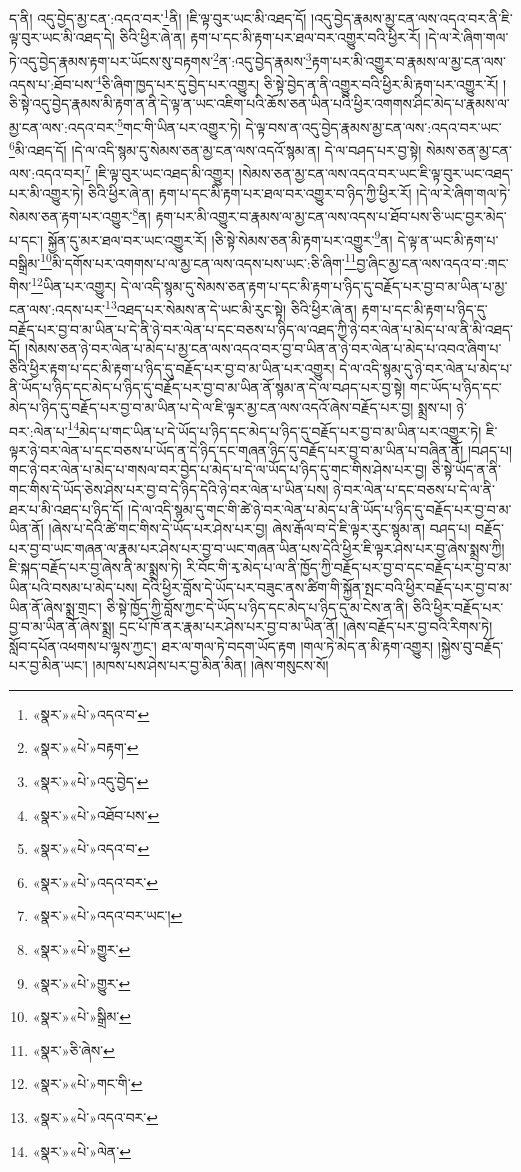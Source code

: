 ད་ནི། འདུ་བྱེད་མྱ་ངན་:འདའ་བར་\footnote{«སྣར་»«པེ་»འདའ་བ་}ནི། །ཇི་ལྟ་བུར་ཡང་མི་འཐད་དོ། །འདུ་བྱེད་རྣམས་མྱ་ངན་ལས་འདའ་བར་ནི་ཇི་ལྟ་བུར་ཡང་མི་འཐད་དེ། ཅིའི་ཕྱིར་ཞེ་ན། རྟག་པ་དང་མི་རྟག་པར་ཐལ་བར་འགྱུར་བའི་ཕྱིར་རོ། །དེ་ལ་རེ་ཞིག་གལ་ཏེ་འདུ་བྱེད་རྣམས་རྟག་པར་ཡོངས་སུ་བརྟགས་\footnote{«སྣར་»«པེ་»བརྟག་}ན་:འདུ་བྱེད་རྣམས་\footnote{«སྣར་»«པེ་»འདུ་བྱེད་}རྟག་པར་མི་འགྱུར་བ་རྣམས་ལ་མྱ་ངན་ལས་འདས་པ་:ཐོབ་པས་\footnote{«སྣར་»«པེ་»འཐོབ་པས་}ཅི་ཞིག་ཁྱད་པར་དུ་བྱེད་པར་འགྱུར། ཅི་སྟེ་བྱེད་ན་ནི་འགྱུར་བའི་ཕྱིར་མི་རྟག་པར་འགྱུར་རོ། །ཅི་སྟེ་འདུ་བྱེད་རྣམས་མི་རྟག་ན་ནི་དེ་ལྟ་ན་ཡང་འཇིག་པའི་ཆོས་ཅན་ཡིན་པའི་ཕྱིར་འགགས་ཤིང་མེད་པ་རྣམས་ལ་མྱ་ངན་ལས་:འདའ་བར་\footnote{«སྣར་»«པེ་»འདའ་བ་}གང་གི་ཡིན་པར་འགྱུར་ཏེ། དེ་ལྟ་བས་ན་འདུ་བྱེད་རྣམས་མྱ་ངན་ལས་:འདའ་བར་ཡང་\footnote{«སྣར་»«པེ་»འདའ་བར་}མི་འཐད་དོ། །དེ་ལ་འདི་སྙམ་དུ་སེམས་ཅན་མྱ་ངན་ལས་འདའོ་སྙམ་ན། དེ་ལ་བཤད་པར་བྱ་སྟེ། སེམས་ཅན་མྱ་ངན་ལས་:འདའ་བར།\footnote{«སྣར་»«པེ་»འདའ་བར་ཡང་།} །ཇི་ལྟ་བུར་ཡང་འཐད་མི་འགྱུར། །སེམས་ཅན་མྱ་ངན་ལས་འདའ་བར་ཡང་ཇི་ལྟ་བུར་ཡང་འཐད་པར་མི་འགྱུར་ཏེ། ཅིའི་ཕྱིར་ཞེ་ན། རྟག་པ་དང་མི་རྟག་པར་ཐལ་བར་འགྱུར་བ་ཉིད་ཀྱི་ཕྱིར་རོ། །དེ་ལ་རེ་ཞིག་གལ་ཏེ་སེམས་ཅན་རྟག་པར་འགྱུར་\footnote{«སྣར་»«པེ་»གྱུར་}ན། རྟག་པར་མི་འགྱུར་བ་རྣམས་ལ་མྱ་ངན་ལས་འདས་པ་ཐོབ་པས་ཅི་ཡང་བྱར་མེད་པ་དང་། སྐྱོན་དུ་མར་ཐལ་བར་ཡང་འགྱུར་རོ། །ཅི་སྟེ་སེམས་ཅན་མི་རྟག་པར་འགྱུར་\footnote{«སྣར་»«པེ་»གྱུར་}ན། དེ་ལྟ་ན་ཡང་མི་རྟག་པ་བསྒྲིམ་\footnote{«སྣར་»«པེ་»སྒྲིམ་}མི་དགོས་པར་འགགས་པ་ལ་མྱ་ངན་ལས་འདས་པས་ཡང་:ཅི་ཞིག་\footnote{«སྣར་»ཅི་ཞེས་}བྱ་ཞིང་མྱ་ངན་ལས་འདའ་བ་:གང་གིས་\footnote{«སྣར་»«པེ་»གང་གི་}ཡིན་པར་འགྱུར། དེ་ལ་འདི་སྙམ་དུ་སེམས་ཅན་རྟག་པ་དང་མི་རྟག་པ་ཉིད་དུ་བརྗོད་པར་བྱ་བ་མ་ཡིན་པ་མྱ་ངན་ལས་:འདས་པར་\footnote{«སྣར་»«པེ་»འདའ་བར་}འཐད་པར་སེམས་ན་དེ་ཡང་མི་རུང་སྟེ། ཅིའི་ཕྱིར་ཞེ་ན། རྟག་པ་དང་མི་རྟག་པ་ཉིད་དུ་བརྗོད་པར་བྱ་བ་མ་ཡིན་པ་དེ་ནི་ཉེ་བར་ལེན་པ་དང་བཅས་པ་ཉིད་ལ་འཐད་ཀྱི་ཉེ་བར་ལེན་པ་མེད་པ་ལ་ནི་མི་འཐད་དོ། །སེམས་ཅན་ཉེ་བར་ལེན་པ་མེད་པ་མྱ་ངན་ལས་འདའ་བར་བྱ་བ་ཡིན་ན་ཉེ་བར་ལེན་པ་མེད་པ་འབའ་ཞིག་པ་ཅིའི་ཕྱིར་རྟག་པ་དང་མི་རྟག་པ་ཉིད་དུ་བརྗོད་པར་བྱ་བ་མ་ཡིན་པར་འགྱུར། དེ་ལ་འདི་སྙམ་དུ་ཉེ་བར་ལེན་པ་མེད་པ་ནི་ཡོད་པ་ཉིད་དང་མེད་པ་ཉིད་དུ་བརྗོད་པར་བྱ་བ་མ་ཡིན་ནོ་སྙམ་ན་དེ་ལ་བཤད་པར་བྱ་སྟེ། གང་ཡོད་པ་ཉིད་དང་མེད་པ་ཉིད་དུ་བརྗོད་པར་བྱ་བ་མ་ཡིན་པ་དེ་ལ་ཇི་ལྟར་མྱ་ངན་ལས་འདའོ་ཞེས་བརྗོད་པར་བྱ། སྨྲས་པ། ཉེ་བར་:ལེན་པ་\footnote{«སྣར་»«པེ་»ལེན་}མེད་པ་གང་ཡིན་པ་དེ་ཡོད་པ་ཉིད་དང་མེད་པ་ཉིད་དུ་བརྗོད་པར་བྱ་བ་མ་ཡིན་པར་འགྱུར་ཏེ། ཇི་ལྟར་ཉེ་བར་ལེན་པ་དང་བཅས་པ་ཡོད་ན་དེ་ཉིད་དང་གཞན་ཉིད་དུ་བརྗོད་པར་བྱ་བ་མ་ཡིན་པ་བཞིན་ནོ། །བཤད་པ། གང་ཉེ་བར་ལེན་པ་མེད་པ་གསལ་བར་བྱེད་པ་མེད་པ་དེ་ལ་ཡོད་པ་ཉིད་དུ་གང་གིས་ཤེས་པར་བྱ། ཅི་སྟེ་ཡོད་ན་ནི་གང་གིས་དེ་ཡོད་ཅེས་ཤེས་པར་བྱ་བ་དེ་ཉིད་དེའི་ཉེ་བར་ལེན་པ་ཡིན་པས། ཉེ་བར་ལེན་པ་དང་བཅས་པ་དེ་ལ་ནི་ཐར་པ་མི་འཐད་པ་ཉིད་དོ། །དེ་ལ་འདི་སྙམ་དུ་གང་གི་ཚེ་ཉེ་བར་ལེན་པ་མེད་པ་ནི་ཡོད་པ་ཉིད་དུ་བརྗོད་པར་བྱ་བ་མ་ཡིན་ནོ། །ཞེས་པ་དེའི་ཚེ་གང་གིས་དེ་ཡོད་པར་ཤེས་པར་བྱ། ཞེས་རྒོལ་བ་དེ་ཇི་ལྟར་རུང་སྙམ་ན། བཤད་པ། བརྗོད་པར་བྱ་བ་ཡང་གཞན་ལ་རྣམ་པར་ཤེས་པར་བྱ་བ་ཡང་གཞན་ཡིན་པས་དེའི་ཕྱིར་ཇི་ལྟར་ཤེས་པར་བྱ་ཞེས་སྨྲས་ཀྱི། ཇི་སྐད་བརྗོད་པར་བྱ་ཞེས་ནི་མ་སྨྲས་ཏེ། རི་བོང་གི་རྭ་མེད་པ་ལ་ནི་ཁྱོད་ཀྱི་བརྗོད་པར་བྱ་བ་དང་བརྗོད་པར་བྱ་བ་མ་ཡིན་པའི་བསམ་པ་མེད་པས། དེའི་ཕྱིར་བློས་དེ་ཡོད་པར་བཟུང་ནས་ཚིག་གི་སྐྱོན་སྤང་བའི་ཕྱིར་བརྗོད་པར་བྱ་བ་མ་ཡིན་ནོ་ཞེས་སྨྲ་གྲང་། ཅི་སྟེ་ཁྱོད་ཀྱི་བློས་ཀྱང་དེ་ཡོད་པ་ཉིད་དང་མེད་པ་ཉིད་དུ་མ་ངེས་ན་ནི། ཅིའི་ཕྱིར་བརྗོད་པར་བྱ་བ་མ་ཡིན་ནོ་ཞེས་སྨྲ། དྲང་པོ་ཁོ་ནར་རྣམ་པར་ཤེས་པར་བྱ་བ་མ་ཡིན་ནོ། །ཞེས་བརྗོད་པར་བྱ་བའི་རིགས་ཏེ། སློབ་དཔོན་འཕགས་པ་ལྷས་ཀྱང་། ཐར་ལ་གལ་ཏེ་བདག་ཡོད་རྟག །གལ་ཏེ་མེད་ན་མི་རྟག་འགྱུར། །སྐྱེས་བུ་བརྗོད་པར་བྱ་མིན་ཡང་། །མཁས་པས་ཤེས་པར་བྱ་མིན་མིན། །ཞེས་གསུངས་སོ། 